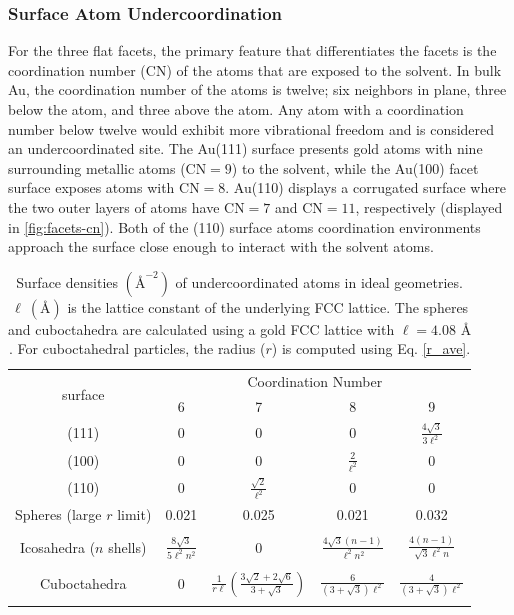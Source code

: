 \subsubsection{Surface Atom Undercoordination}
For the three flat facets, the primary feature that differentiates the
facets is the coordination number (CN) of the atoms that are exposed
to the solvent. In bulk Au, the coordination number of the atoms is
twelve; six neighbors in plane, three below the atom, and three above the
atom. Any atom with a coordination number below twelve would exhibit more
vibrational freedom and is considered an undercoordinated site. The
Au(111) surface presents gold atoms with nine surrounding metallic
atoms ($\text{CN} = 9$) to the solvent, while the Au(100) facet
surface exposes atoms with $\text{CN}=8$.  Au(110) displays a
corrugated surface where the two outer layers of atoms have
$\text{CN}=7$ and $\text{CN}=11$, respectively (displayed in \ref{fig:facets-cn}).
Both of the (110) surface atoms coordination environments
approach the surface close enough to interact with the solvent atoms.

\begin{table}
\centering
\caption{Surface densities $(\text{\AA}^{-2})$ of undercoordinated
  atoms in ideal geometries. $\ell~(\text{\AA})$ is the
  lattice constant of the underlying FCC lattice.  The spheres and
  cuboctahedra are calculated using a gold FCC lattice with $\ell = 4.08
  \text{~\AA}$.  For cuboctahedral particles, the radius ($r$) is computed
  using Eq. \eqref{r_ave}.
  \label{tab:undercoord}}
\begin{tabular}{ c|cccc }
\toprule
\multirow{2}{*}{surface} & \multicolumn{4}{c}{Coordination Number}\\
        & 6 & 7 & 8 & 9 \\
 \midrule
(111)      & 0 & 0     & 0     & $\frac{4 \sqrt{3}}{3 \ell^2}$ \\
(100)      & 0 & 0     & $\frac{2}{\ell^2}$ & 0     \\
(110)      & 0 & $\frac{\sqrt{2}}{\ell^2}$ & 0     & 0     \\
 \midrule
Spheres (large $r$ limit)    & 0.021 & 0.025 & 0.021 & 0.032\\ \\
Icosahedra ($n$ shells)  & $\frac{8\sqrt{3}}{5\ell^2n^2}$  &  0 &
 $\frac{4\sqrt{3}(n-1)}{\ell^2n^2}$ &
 $\frac{4(n - 1)}{\sqrt{3}\ell^2 n}$ \\ \\
Cuboctahedra & 0 & $\frac{1}{r\ell} \left(\frac{3\sqrt{2} + 2\sqrt{6}}{3+\sqrt{3}}\right)$ & $\frac{6}{(3+\sqrt{3})\ell^2}$ & $\frac{4}{(3+\sqrt{3})\ell^2}$\\ \\
\bottomrule
\end{tabular}
\end{table}


